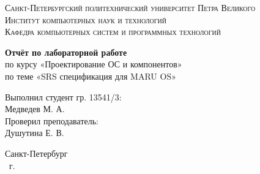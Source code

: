 \begin{titlepage}
    \centering
    \textsc{Санкт-Петербургский политехнический университет Петра Великого}\\[3mm]
    \textsc{Институт компьютерных наук и технологий}\\[3mm]
    \textsc{Кафедра компьютерных систем и программных технологий}
	
	\vfill
	
	\textbf{Отчёт по лабораторной работе }\\[3mm]
	по курсу «Проектирование ОС и компонентов»\\[3mm]
	по теме «SRS спецификация для MARU OS»\\[41mm]
	
    \begin{flushright}
	\begin{minipage}{.35\textwidth}
		Выполнил студент гр. 13541/3:\\
		Медведев М. А.\\[3mm]
		Проверил преподаватель:\\
		Душутина Е. В.
	\end{minipage}
    \end{flushright}
	
	\vfill

	Санкт-Петербург\\
	\the\year\ г.
\end{titlepage}
